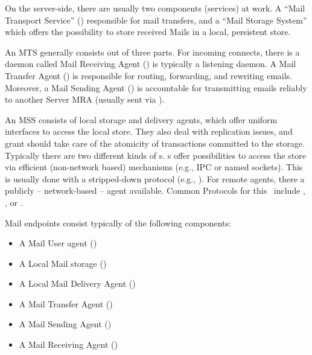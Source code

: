 On the server-side, there are usually two components (services) at work. A ``Mail Transport Service'' () responsible for mail transfers, and a ``Mail Storage System'' which offers the possibility to store received Mails in a local, persistent store.\par

An MTS generally consists out of three parts. For incoming connects, there is a daemon called Mail Receiving Agent () is typically a  listening daemon. A Mail Transfer Agent () is responsible for routing, forwarding, and rewriting emails. Moreover, a Mail Sending Agent () is accountable for transmitting emails reliably to another Server MRA (usually sent via ).\par

An MSS consists of local storage and delivery agents, which offer uniform interfaces to access the local store. They also deal with replication issues, and grant should take care of the atomicity of transactions committed to the storage. Typically there are two different kinds of s. s offer possibilities to access the store via efficient (non-network based) mechanisms (e.g., IPC or named sockets). This is usually done with a stripped-down protocol (e.g., ). For remote agents, there a publicly -- network-based -- agent available. Common Protocols for this \ include , , or .\par

Mail endpoints consist typically of the following components:
\begin{itemize}
	\item A Mail User agent ()
	\item A Local Mail storage ()
	\item A Local Mail Delivery Agent ()
	\item A Mail Transfer Agent ()
	\item A Mail Sending Agent ()
	\item A Mail Receiving Agent ()
\end{itemize}

